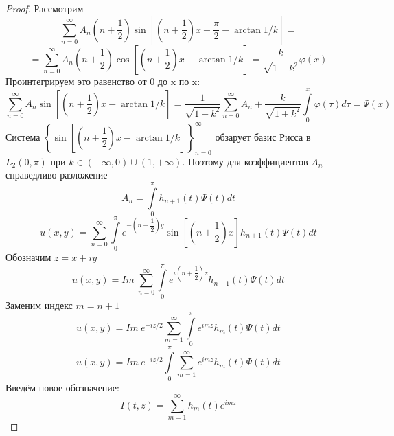 \documentclass[12pt, a4paper]{extarticle}
\numberwithin{equation}{section}
\numberwithin{lemma}{section}
\numberwithin{definition}{section}
\numberwithin{notabene}{section}
\numberwithin{corollary}{section}
\begin{document}
	\begin{proof}
		Рассмотрим
		\begin{equation*}
			\sum\limits_{n=0}^{\infty} A_n \left(n + \dfrac12 \right) \sin{\left[\left(n +\dfrac12\right)x + \dfrac\pi2 - \arctan{1/k} \right]} = 
		\end{equation*}
		\begin{equation*}
			=\sum\limits_{n=0}^{\infty} A_n \left(n + \dfrac12 \right) \cos{\left[\left(n +\dfrac12\right)x - \arctan{1/k} \right]} = 
			 \dfrac{k}{\sqrt{1+k^2}} \varphi(x)
		\end{equation*}
		Проинтегрируем это равенство от 0 до x по x:
		\begin{equation*}
			\sum\limits_{n=0}^{\infty} A_n \sin{\left[\left(n +\dfrac12\right)x - \arctan{1/k} \right]} = \dfrac{1}{\sqrt{1+k^2}} \sum\limits_{n=0}^{\infty} A_n + \dfrac{k}{\sqrt{1+k^2}} \int\limits_0^x \varphi(\tau) d\tau = \Psi(x)
		\end{equation*}
		Система $\left\{\sin{\left[\left(n +\dfrac12\right)x - \arctan{1/k} \right]}		\right\}_{n=0}^{\infty}$ обзарует базис Рисса в $L_2(0,\pi)$ при $k\in (-\infty, 0) \cup (1, +\infty)$. Поэтому для коэффициентов $A_n$ справедливо разложение
		\begin{equation*}
				A_n = \int\limits_0^\pi h_{n+1}(t) \Psi(t) dt
		\end{equation*}
		\begin{equation*}
			u(x,y) = \sum\limits_{n=0}^{\infty} \int\limits_0^\pi e^{-\left(n + \dfrac12\right)y} \sin{\left[\left(n + \dfrac12\right)x\right]} h_{n+1}(t) \Psi(t) dt
		\end{equation*}
	Обозначим $z = x + iy$
		\begin{equation*}
			u(x,y) = Im \  \sum\limits_{n=0}^{\infty} \int\limits_0^\pi e^{i\left(n+\dfrac12\right)z} h_{n+1}(t) \Psi(t) dt
		\end{equation*}
	Заменим индекс $m = n + 1$
			\begin{equation*}
			u(x,y) = Im \ e^{-iz/2} \sum\limits_{m=1}^{\infty} \int\limits_0^\pi e^{imz} h_{m}(t) \Psi(t) dt
		\end{equation*}
	\begin{equation*}
		u(x,y) = Im \ e^{-iz/2} \int\limits_0^\pi \sum\limits_{m=1}^{\infty}  e^{imz} h_{m}(t) \Psi(t) dt
	\end{equation*}
	Введём новое обозначение:
	\begin{equation*}
		I(t,z) = \sum\limits_{m=1}^{\infty}  h_{m}(t)  e^{im z}
	\end{equation*}
	\begin{equation*}

\end{equation*}
\end{proof}
\end{document}
